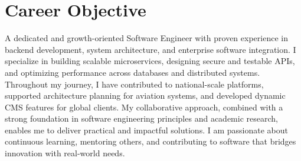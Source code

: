 \section{\textbf{Career Objective}}
A dedicated and growth-oriented Software Engineer with proven experience in backend development, system architecture, and enterprise software integration. I specialize in building scalable microservices, designing secure and testable APIs, and optimizing performance across databases and distributed systems. Throughout my journey, I have contributed to national-scale platforms, supported architecture planning for aviation systems, and developed dynamic CMS features for global clients. My collaborative approach, combined with a strong foundation in software engineering principles and academic research, enables me to deliver practical and impactful solutions. I am passionate about continuous learning, mentoring others, and contributing to software that bridges innovation with real-world needs.
